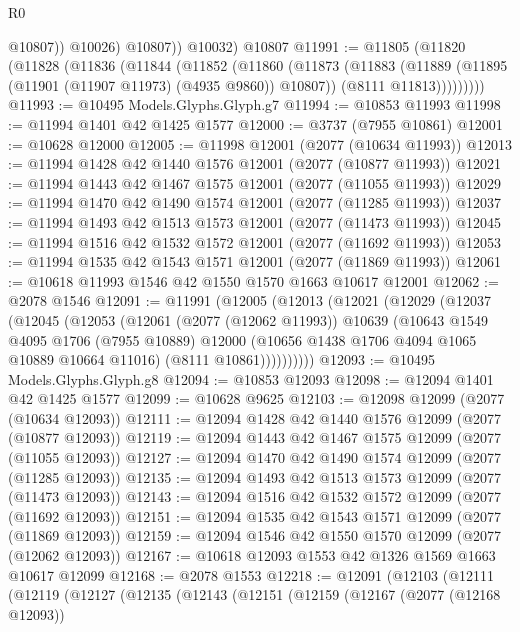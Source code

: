 \begin{lexlean}{R0}
\begin{coremodule}
                @10807))
            @10026)
          @10807))
      @10032)
    @10807
@11991 := @11805
    (@11820
      (@11828
        (@11836
          (@11844
            (@11852
              (@11860
                (@11873
                  (@11883
                    (@11889 (@11895 (@11901 (@11907 @11973) (@4935 @9860)) @10807))
                    (@8111 @11813)))))))))
@11993 := @10495 Models.Glyphs.Glyph.g7
@11994 := @10853 @11993
@11998 := @11994 @1401 @42 @1425 @1577
@12000 := @3737 (@7955 @10861)
@12001 := @10628 @12000
@12005 := @11998 @12001 (@2077 (@10634 @11993))
@12013 := @11994 @1428 @42 @1440 @1576 @12001 (@2077 (@10877 @11993))
@12021 := @11994 @1443 @42 @1467 @1575 @12001 (@2077 (@11055 @11993))
@12029 := @11994 @1470 @42 @1490 @1574 @12001 (@2077 (@11285 @11993))
@12037 := @11994 @1493 @42 @1513 @1573 @12001 (@2077 (@11473 @11993))
@12045 := @11994 @1516 @42 @1532 @1572 @12001 (@2077 (@11692 @11993))
@12053 := @11994 @1535 @42 @1543 @1571 @12001 (@2077 (@11869 @11993))
@12061 := @10618 @11993 @1546 @42 @1550 @1570 @1663 @10617 @12001
@12062 := @2078 @1546
@12091 := @11991
    (@12005
      (@12013
        (@12021
          (@12029
            (@12037
              (@12045
                (@12053
                  (@12061
                    (@2077 (@12062 @11993))
                    @10639
                    (@10643
                      @1549
                      @4095
                      @1706
                      (@7955 @10889)
                      @12000
                      (@10656 @1438 @1706 @4094 @1065 @10889 @10664 @11016)
                      (@8111 @10861))))))))))
@12093 := @10495 Models.Glyphs.Glyph.g8
@12094 := @10853 @12093
@12098 := @12094 @1401 @42 @1425 @1577
@12099 := @10628 @9625
@12103 := @12098 @12099 (@2077 (@10634 @12093))
@12111 := @12094 @1428 @42 @1440 @1576 @12099 (@2077 (@10877 @12093))
@12119 := @12094 @1443 @42 @1467 @1575 @12099 (@2077 (@11055 @12093))
@12127 := @12094 @1470 @42 @1490 @1574 @12099 (@2077 (@11285 @12093))
@12135 := @12094 @1493 @42 @1513 @1573 @12099 (@2077 (@11473 @12093))
@12143 := @12094 @1516 @42 @1532 @1572 @12099 (@2077 (@11692 @12093))
@12151 := @12094 @1535 @42 @1543 @1571 @12099 (@2077 (@11869 @12093))
@12159 := @12094 @1546 @42 @1550 @1570 @12099 (@2077 (@12062 @12093))
@12167 := @10618 @12093 @1553 @42 @1326 @1569 @1663 @10617 @12099
@12168 := @2078 @1553
@12218 := @12091
    (@12103
      (@12111
        (@12119
          (@12127
            (@12135
              (@12143
                (@12151
                  (@12159
                    (@12167
                      (@2077 (@12168 @12093))

\end{coremodule}
\end{lexlean}
